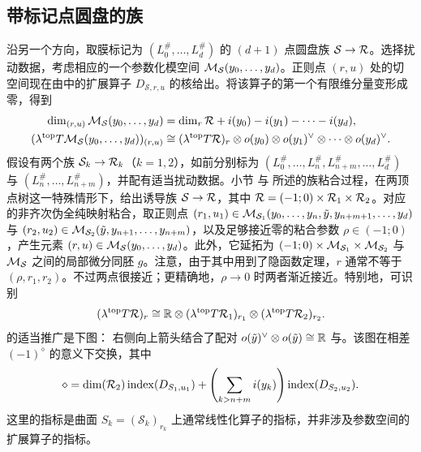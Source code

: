 \subsection{带标记点圆盘的族}\label{sec:12d}
沿另一个方向，取膜标记为 $(L_0^\#,\allowbreak \ldots,\allowbreak L_d^\#)$ 的 $(d+1)$ 点圆盘族 $\mathcal S\to\mathcal R$。选择扰动数据，考虑相应的一个参数化模空间 $\mathcal M_{\mathcal S}(y_0,\allowbreak \ldots,\allowbreak y_d)$。正则点 $(r,\allowbreak u)$ 处的切空间现在由中的扩展算子 $D_{\mathcal S,\allowbreak r,\allowbreak u}$ 的核给出。将该算子的第一个有限维分量变形成零，得到
\begin{equation}\label{eq:12.8}
\begin{aligned}
\dim_{(r,u)}\mathcal M_{\mathcal S}(y_0,\ldots,y_d)&=\dim_r\mathcal R+i(y_0)-i(y_1)-\cdots-i(y_d),\\
(\lambda^{\mathrm{top}}T\mathcal M_{\mathcal S}(y_0,\ldots,y_d))_{(r,u)}
&\cong(\lambda^{\mathrm{top}}T\mathcal R)_r\otimes o(y_0)\otimes o(y_1)^\vee\otimes\cdots\otimes o(y_d)^\vee.
\end{aligned}
\end{equation}
假设有两个族 $\mathcal S_k\to\mathcal R_k$（$k=1,\allowbreak 2$），如前分别标为 $(L_0^\#,\allowbreak \ldots,\allowbreak L_n^\#,\allowbreak L_{n+m}^\#,\allowbreak \ldots,\allowbreak L_d^\#)$ 与 $(L_n^\#,\allowbreak \ldots,\allowbreak L_{n+m}^\#)$，并配有适当扰动数据。小节  与
 所述的族粘合过程，在两顶点树这一特殊情形下，给出诱导族 $\mathcal S\to\mathcal R$，其中 $\mathcal R=(-1;0)\times\mathcal R_1\times\mathcal R_2$。对应的非齐次伪全纯映射粘合，取正则点 $(r_1,\allowbreak u_1)\in\mathcal M_{\mathcal S_1}(y_0,\allowbreak \ldots,\allowbreak y_n,\allowbreak \tilde y,\allowbreak y_{n+m+1},\allowbreak \ldots,\allowbreak y_d)$ 与 $(r_2,\allowbreak u_2)\in\mathcal M_{\mathcal S_2}(\tilde y,\allowbreak y_{n+1},\allowbreak \ldots,\allowbreak y_{n+m})$，以及足够接近零的粘合参数 $\rho\in(-1;0)$，产生元素 $(r,\allowbreak u)\in\mathcal M_{\mathcal S}(y_0,\allowbreak \ldots,\allowbreak y_d)$。此外，它延拓为 $(-1;0)\times\mathcal M_{\mathcal S_1}\times\mathcal M_{\mathcal S_2}$ 与 $\mathcal M_{\mathcal S}$ 之间的局部微分同胚 $g$。注意，由于其中用到了隐函数定理，$r$ 通常不等于 $(\rho,\allowbreak r_1,\allowbreak r_2)$。不过两点很接近；更精确地，$\rho\to0$ 时两者渐近接近。特别地，可识别
\begin{equation}\label{eq:12.9}
(\lambda^{\mathrm{top}}T\mathcal R)_r\cong\mathbb R\otimes(\lambda^{\mathrm{top}}T\mathcal R_1)_{r_1}\otimes(\lambda^{\mathrm{top}}T\mathcal R_2)_{r_2}.
\end{equation}
的适当推广是下图：
右侧向上箭头结合了配对 $o(\tilde y)^\vee\otimes o(\tilde y)\cong\mathbb R$ 与。该图在相差 $(-1)^\diamond$ 的意义下交换，其中
\[
\diamond=\dim(\mathcal R_2)\operatorname{index}(D_{S_1,u_1})+
\left(\sum_{k>n+m}i(y_k)\right)\operatorname{index}(D_{S_2,u_2}).
\]
这里的指标是曲面 $S_k=(\mathcal S_k)_{r_k}$ 上通常线性化算子的指标，并非涉及参数空间的扩展算子的指标。
